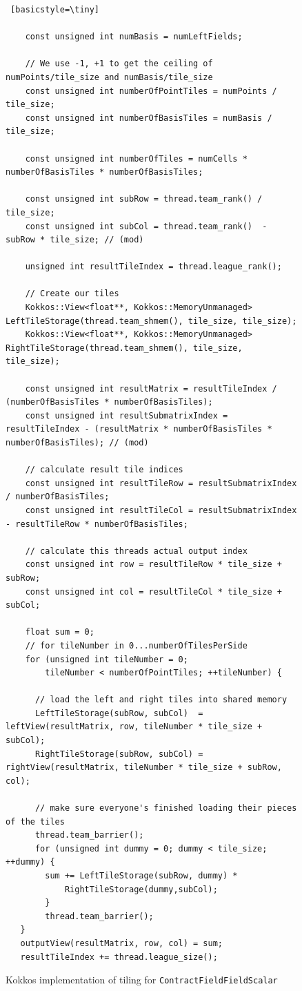 \begin{figure}[H]
    \begin{lstlisting} [basicstyle=\tiny]
    
    const unsigned int numBasis = numLeftFields;

    // We use -1, +1 to get the ceiling of numPoints/tile_size and numBasis/tile_size
    const unsigned int numberOfPointTiles = numPoints / tile_size;
    const unsigned int numberOfBasisTiles = numBasis / tile_size;

    const unsigned int numberOfTiles = numCells * numberOfBasisTiles * numberOfBasisTiles;

    const unsigned int subRow = thread.team_rank() / tile_size;
    const unsigned int subCol = thread.team_rank()  - subRow * tile_size; // (mod)

    unsigned int resultTileIndex = thread.league_rank();

    // Create our tiles
    Kokkos::View<float**, Kokkos::MemoryUnmanaged> LeftTileStorage(thread.team_shmem(), tile_size, tile_size);
    Kokkos::View<float**, Kokkos::MemoryUnmanaged> RightTileStorage(thread.team_shmem(), tile_size, tile_size);

    const unsigned int resultMatrix = resultTileIndex / (numberOfBasisTiles * numberOfBasisTiles);
    const unsigned int resultSubmatrixIndex = resultTileIndex - (resultMatrix * numberOfBasisTiles * numberOfBasisTiles); // (mod)

    // calculate result tile indices
    const unsigned int resultTileRow = resultSubmatrixIndex / numberOfBasisTiles;
    const unsigned int resultTileCol = resultSubmatrixIndex  - resultTileRow * numberOfBasisTiles;

    // calculate this threads actual output index
    const unsigned int row = resultTileRow * tile_size + subRow;
    const unsigned int col = resultTileCol * tile_size + subCol;

    float sum = 0;
    // for tileNumber in 0...numberOfTilesPerSide
    for (unsigned int tileNumber = 0;
        tileNumber < numberOfPointTiles; ++tileNumber) {

      // load the left and right tiles into shared memory
      LeftTileStorage(subRow, subCol)  = leftView(resultMatrix, row, tileNumber * tile_size + subCol);
      RightTileStorage(subRow, subCol) = rightView(resultMatrix, tileNumber * tile_size + subRow, col);
      
      // make sure everyone's finished loading their pieces of the tiles
      thread.team_barrier();
      for (unsigned int dummy = 0; dummy < tile_size; ++dummy) {
        sum += LeftTileStorage(subRow, dummy) *
            RightTileStorage(dummy,subCol);
        }
        thread.team_barrier();
   }
   outputView(resultMatrix, row, col) = sum;
   resultTileIndex += thread.league_size();
 \end{lstlisting}
 \caption[\texttt{ContractFieldFieldScalar} tiling implementation]{Kokkos
     implementation of tiling for \texttt{ContractFieldFieldScalar}}
 \label{lst:ContractFieldFieldScalarTilingCode}
\end{figure}


